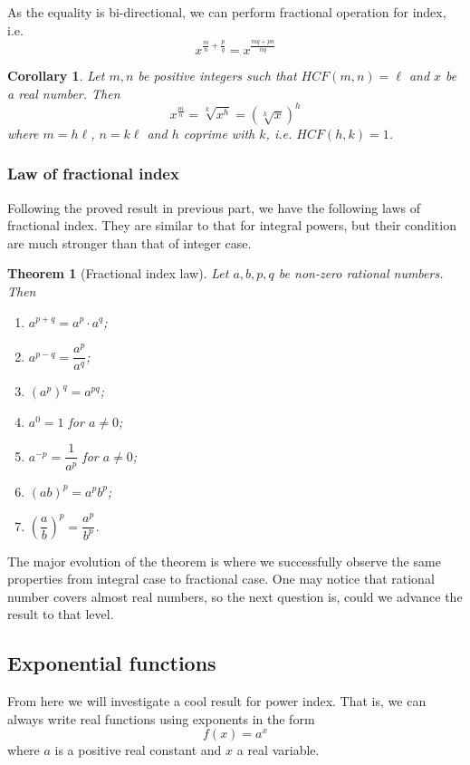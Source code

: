 \documentclass[12pt]{article}
\newtheorem*{theorem}{Theorem}
\newtheorem*{corollary}{Corollary}
\begin{document}
    As the equality is bi-directional, we can perform fractional operation for index, i.e. $$x^{\frac{m}{n}+\frac{p}{q}}=x^{\frac{mq+pn}{nq}}$$

    \begin{corollary}
        Let $m,n$ be positive integers such that $HCF(m,n)=\ell$ and $x$ be a real number.  Then $$x^{\frac{m}{n}}=\sqrt[k]{x^h}=(\sqrt[k]{x})^h$$ where $m=h\ell$, $n=k\ell$ and $h$ coprime with $k$, i.e. $HCF(h,k)=1$.
    \end{corollary}

    \subsubsection*{Law of fractional index}

    Following the proved result in previous part, we have the following laws of fractional index. They are similar to that for integral powers, but their condition are much stronger than that of integer case.

    \begin{theorem}[Fractional index law]
        Let $a,b,p,q$ be non-zero rational numbers. Then\begin{enumerate}
            \item $a^{p+q}=a^p\cdot a^q$;
            \item $a^{p-q}=\dfrac{a^p}{a^q}$;
            \item $(a^p)^q=a^{pq}$;
            \item $a^0=1$ for $a\neq 0$;
            \item $a^{-p}=\dfrac{1}{a^p}$ for $a\neq 0$;
            \item $(ab)^p=a^p b^p$;
            \item $(\dfrac{a}{b})^p=\dfrac{a^p}{b^p}$.
        \end{enumerate}
    \end{theorem}

    The major evolution of the theorem is where we successfully observe the same properties from integral case to fractional case. One may notice that rational number covers almost real numbers, so the next question is, could we advance the result to that level.

    \subsection{Exponential functions}

    From here we will investigate a cool result for power index. That is, we can always write real functions using exponents in the form $$f(x)=a^x$$ where $a$ is a positive real constant and $x$ a real variable.
\end{document}
